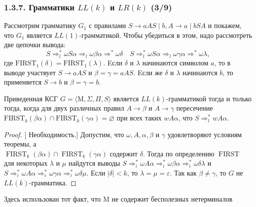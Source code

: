 \documentclass[mathserif,12pt,aspectratio=169]{beamer}
\let\emptyset\varnothing
\def\proofsection#1{\par{\color{brown}\sffamily\small  [\;}{\sffamily\small\color{brown} #1}{\sffamily\small\color{brown}\;]}\;}
\begin{document}
\begin{frame}
\frametitle{1.3.7. Грамматики $LL(k)$ и $LR(k)$ (3/9)}
\begin{example}
Рассмотрим грамматику \( G_1 \) с правилами 
\(S \rightarrow aAS \mid b, A \rightarrow a \mid bSA \) 
и покажем, что $G_1$ 
является $LL(1)$-грамматикой. 
Чтобы убедиться в этом, надо рассмотреть две цепочки вывода:
 \[
 S \Rightarrow_l^* \omega S\alpha \Rightarrow_l \omega\beta\alpha \Rightarrow^* \omega\delta \quad
 S \Rightarrow_l^* \omega S\alpha \Rightarrow_l \omega\gamma\alpha \Rightarrow^* \omega\lambda ,\]
где \(\mathrm{FIRST}_1(\delta) = \mathrm{FIRST}_1(\lambda)\).
 Eсли \( \delta \) и \( \lambda \) начинаются символом \( a \), то в выводе участвует \( S \to aAS \) и \( \beta = \gamma = aAS \). Eсли же \( \delta \) и \( \lambda \) начинаются \( b \), то применяется \( S \to b \) и \( \beta = \gamma = b \).
\end{example}

\begin{theorem}
Приведенная КСГ $G = \langle \mathrm{M}, \Sigma, \Pi, S \rangle$ является $LL(k)$-грамматикой тогда и только тогда, когда для двух различных правил \( A \to \beta \) и \( A \to \gamma \) пересечение\\ \( \mathrm{FIRST}_k(\beta\alpha) \cap \mathrm{FIRST}_k(\gamma\alpha) = \emptyset \) при всех таких \( wA\alpha \), что \( S \Rightarrow_l^* wA\alpha \).
\end{theorem}
\begin{proof}
\proofsection{Необходимость.}
Допустим, что \( \omega, A, \alpha, \beta \) и \( \gamma \) 
удовлетворяют условиям теоремы, а \\
\( \operatorname{FIRST}_k(\beta\alpha) \cap \operatorname{FIRST}_k(\gamma\alpha) \) 
содержит \( \delta \). 
Тогда по определению \(\operatorname{FIRST}\) для некоторых \( \lambda \) и \( \mu \) найдутся выводы 
\(
S \Rightarrow_i^* \omega A\alpha \Rightarrow_i^* \omega \beta\alpha \Rightarrow_i^* \omega \delta \lambda
\)
и 
\(
S \Rightarrow_i^* \omega A \alpha \Rightarrow_i^* \omega\gamma\alpha \Rightarrow_i^* \omega \delta \mu.
\)
Если \( |\delta| < k \), то \( \lambda = \mu = \varepsilon \). Так как \( \beta \neq \gamma \), то \( G \) не \( LL(k) \)-грамматика.
\end{proof}
\begin{remark}
Здесь использован тот факт, что \( \mathrm{M} \) не содержит бесполезных нетерминалов
\end{remark}
\end{frame}
\end{document}
